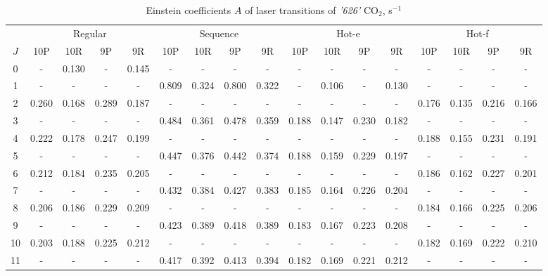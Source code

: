 \documentclass{report}
\begin{document}
\begin{appendices}
\begin{sidewaystable}
\centering
\caption{Einstein coefficients $A$ of laser transitions of \textit{'626'} {CO$_2$}, s$^{-1}$}
\label{table:A626}
\scriptsize
\begin{tabular}{|c|cccc|cccc|cccc|cccc|}
\hline
& \multicolumn{4}{c|}{Regular}& \multicolumn{4}{c|}{Sequence}& \multicolumn{4}{c|}{Hot-e}& \multicolumn{4}{c|}{Hot-f}\\
$J$ & 10P & 10R & 9P & 9R & 10P & 10R & 9P & 9R & 10P & 10R & 9P & 9R & 10P & 10R & 9P & 9R\\ 
\hline
0  &   -   & 0.130 &   -   & 0.145 &   -   &   -   &   -   &   -   &   -   &   -   &   -   &   -   &   -   &   -   &   -   &   -  \\
1  &   -   &   -   &   -   &   -   & 0.809 & 0.324 & 0.800 & 0.322 &   -   & 0.106 &   -   & 0.130 &   -   &   -   &   -   &   -  \\
2  & 0.260 & 0.168 & 0.289 & 0.187 &   -   &   -   &   -   &   -   &   -   &   -   &   -   &   -   & 0.176 & 0.135 & 0.216 & 0.166\\
3  &   -   &   -   &   -   &   -   & 0.484 & 0.361 & 0.478 & 0.359 & 0.188 & 0.147 & 0.230 & 0.182 &   -   &   -   &   -   &   -  \\
4  & 0.222 & 0.178 & 0.247 & 0.199 &   -   &   -   &   -   &   -   &   -   &   -   &   -   &   -   & 0.188 & 0.155 & 0.231 & 0.191\\
5  &   -   &   -   &   -   &   -   & 0.447 & 0.376 & 0.442 & 0.374 & 0.188 & 0.159 & 0.229 & 0.197 &   -   &   -   &   -   &   -  \\
6  & 0.212 & 0.184 & 0.235 & 0.205 &   -   &   -   &   -   &   -   &   -   &   -   &   -   &   -   & 0.186 & 0.162 & 0.227 & 0.201\\
7  &   -   &   -   &   -   &   -   & 0.432 & 0.384 & 0.427 & 0.383 & 0.185 & 0.164 & 0.226 & 0.204 &   -   &   -   &   -   &   -  \\
8  & 0.206 & 0.186 & 0.229 & 0.209 &   -   &   -   &   -   &   -   &   -   &   -   &   -   &   -   & 0.184 & 0.166 & 0.225 & 0.206\\
9  &   -   &   -   &   -   &   -   & 0.423 & 0.389 & 0.418 & 0.389 & 0.183 & 0.167 & 0.223 & 0.208 &   -   &   -   &   -   &   -  \\
10 & 0.203 & 0.188 & 0.225 & 0.212 &   -   &   -   &   -   &   -   &   -   &   -   &   -   &   -   & 0.182 & 0.169 & 0.222 & 0.210\\
11 &   -   &   -   &   -   &   -   & 0.417 & 0.392 & 0.413 & 0.394 & 0.182 & 0.169 & 0.221 & 0.212 &   -   &   -   &   -   &   -  \\

\end{tabular}
\end{sidewaystable}
\end{appendices}
\end{document}
